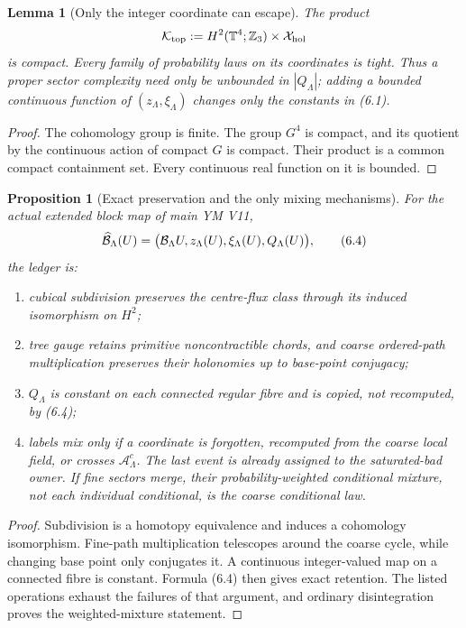 \documentclass[11pt]{article}
\newtheorem{lemma}[theorem]{Lemma}
\newtheorem{proposition}[theorem]{Proposition}
\theoremstyle{definition}
\theoremstyle{remark}
\newcommand{\cA}{\mathcal A}
\begin{document}
\begin{lemma}[Only the integer coordinate can escape]
\label{lem:only-integer-escapes}
The product
\[
 {\cal K}_{\rm top}
 :=H^2(\mathbb T^4;\mathbb Z_3)\times{\cal X}_{\rm hol}
\]
is compact.  Every family of probability laws on its coordinates is tight.
Thus a proper sector complexity need only be unbounded in $|Q_\Lambda|$;
adding a bounded continuous function of $(z_\Lambda,\xi_\Lambda)$ changes
only the constants in (6.1).
\end{lemma}

\begin{proof}
The cohomology group is finite.  The group $G^4$ is compact, and its quotient
by the continuous action of compact $G$ is compact.  Their product is a
common compact containment set.  Every continuous real function on it is
bounded.
\end{proof}

\begin{proposition}[Exact preservation and the only mixing mechanisms]
\label{prop:sector-ledger}
For the actual extended block map of main YM V11,
\[
 \widehat{\cal B}_\Lambda(U)
 =
 \bigl({\cal B}_\Lambda U,z_\Lambda(U),
       \xi_\Lambda(U),Q_\Lambda(U)\bigr),                    \tag{6.4}
\]
the ledger is:
\begin{enumerate}[label=\textup{(\roman*)},leftmargin=3.5em]
\item cubical subdivision preserves the centre-flux class through its
      induced isomorphism on $H^2$;
\item tree gauge retains primitive noncontractible chords, and coarse
      ordered-path multiplication preserves their holonomies up to
      base-point conjugacy;
\item $Q_\Lambda$ is constant on each connected regular fibre and is copied,
      not recomputed, by (6.4);
\item labels mix only if a coordinate is forgotten, recomputed from the
      coarse local field, or crosses $\cA_\Lambda^c$.  The last event is
      already assigned to the saturated-bad owner.  If fine sectors merge,
      their probability-weighted conditional mixture, not each individual
      conditional, is the coarse conditional law.
\end{enumerate}
\end{proposition}

\begin{proof}
Subdivision is a homotopy equivalence and induces a cohomology isomorphism.
Fine-path multiplication telescopes around the coarse cycle, while changing
base point only conjugates it.  A continuous integer-valued map on a
connected fibre is constant.  Formula (6.4) then gives exact retention.
The listed operations exhaust the failures of that argument, and ordinary
disintegration proves the weighted-mixture statement.
\end{proof}
\end{document}
